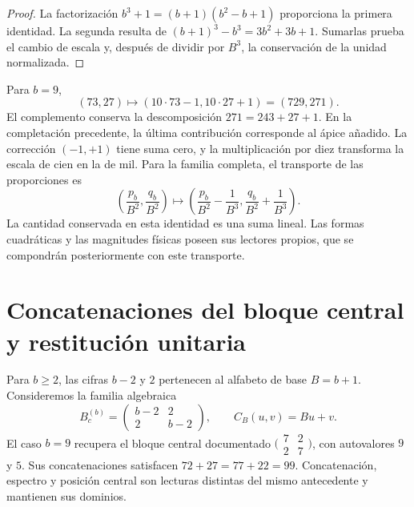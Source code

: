 \begin{proof}
La factorización \(b^3+1=(b+1)(b^2-b+1)\) proporciona la primera
identidad. La segunda resulta de
\((b+1)^3-b^3=3b^2+3b+1\). Sumarlas prueba el cambio de escala y,
después de dividir por \(B^3\), la conservación de la unidad normalizada.
\end{proof}

Para \(b=9\),
\begin{equation}
 (73,27)\longmapsto(10\cdot73-1,10\cdot27+1)=(729,271).
 \label{x_reciprocidad:lib03:caso-729}
\end{equation}
El complemento conserva la descomposición \(271=243+27+1\). En la
completación precedente, la última contribución corresponde al ápice
añadido. La corrección \((-1,+1)\) tiene suma cero, y la multiplicación
por diez transforma la escala de cien en la de mil. Para la familia
completa, el transporte de las proporciones es
\begin{equation}
 \left(\frac{p_b}{B^2},\frac{q_b}{B^2}\right)
 \longmapsto
 \left(\frac{p_b}{B^2}-\frac1{B^3},
       \frac{q_b}{B^2}+\frac1{B^3}\right).
 \label{x_reciprocidad:lib03:fracciones-completacion}
\end{equation}
La cantidad conservada en esta identidad es una suma lineal. Las formas
cuadráticas y las magnitudes físicas poseen sus lectores propios, que se
compondrán posteriormente con este transporte.

\section{Concatenaciones del bloque central y restitución unitaria}
\label{x_reciprocidad:lib03:centro}

Para \(b\geq2\), las cifras \(b-2\) y \(2\) pertenecen al alfabeto de
base \(B=b+1\). Consideremos la familia algebraica
\begin{equation}
 B_c^{(b)}=\begin{pmatrix}b-2&2\\2&b-2\end{pmatrix},\qquad
 C_B(u,v)=Bu+v.
 \label{x_reciprocidad:lib03:bloque-central}
\end{equation}
El caso \(b=9\) recupera el bloque central documentado
\(\bigl(\begin{smallmatrix}7&2\\2&7\end{smallmatrix}\bigr)\), con
autovalores \(9\) y \(5\). Sus concatenaciones satisfacen
\(72+27=77+22=99\). Concatenación, espectro y posición central son
lecturas distintas del mismo antecedente y mantienen sus dominios.

